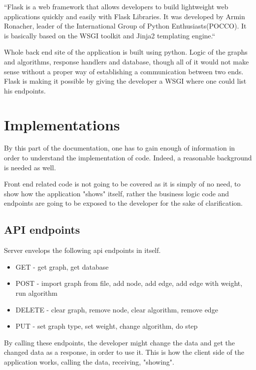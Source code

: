 ``Flask is a web framework that allows developers to build lightweight web applications quickly and easily with Flask Libraries. It was developed by Armin Ronacher, leader of the International Group of Python Enthusiasts(POCCO). It is basically based on the WSGI toolkit and Jinja2 templating engine.``~\cite{flask-def}

Whole back end site of the application is built using python. Logic of the graphs and algorithms, response handlers and database, though all of it would not make sense without a proper way of establishing a communication between two ends. Flask is making it possible by giving the developer a WSGI where one could list his endpoints.

\section{Implementations}

By this part of the documentation, one has to gain enough of information in order to understand the implementation of  code. Indeed, a reasonable background is needed as well. 

Front end related code is not going to be covered as it is simply of no need, to show how the application "shows" itself, rather the business logic code and endpoints are going to be exposed to the developer for the sake of clarification. 

\subsection{API endpoints}

Server envelops the following api endpoints in itself.

\begin{itemize}
	\item GET - get graph, get database
	\item POST - import graph from file, add node, add edge, add edge with weight, run algorithm
	\item DELETE - clear graph, remove node, clear algorithm, remove edge
	\item PUT - set graph type, set weight, change algorithm, do step
\end{itemize}

By calling these endpoints, the developer might change the data and get the changed data as a response, in order to use it. This is how the client side of the application works, calling the data, receiving, "showing".

